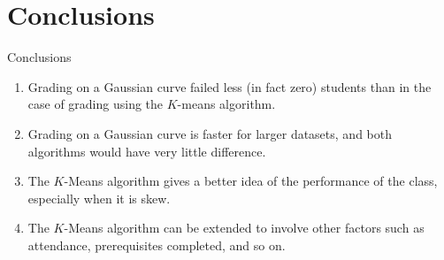 \documentclass{beamer}
\theoremstyle{remark}
\begin{document}
\section{Conclusions}
\begin{frame}{Conclusions}
    \begin{enumerate}
        \item Grading on a Gaussian curve failed less (in fact zero) students 
        than in the case of grading using the $K$-means algorithm.
        \item Grading on a Gaussian curve is faster for larger datasets, and
        both algorithms would have very little difference.
        \item The $K$-Means algorithm gives a better idea of the performance
        of the class, especially when it is skew.
        \item The $K$-Means algorithm can be extended to involve other factors
        such as attendance, prerequisites completed, and so on.
    \end{enumerate}
\end{frame}
\end{document}
